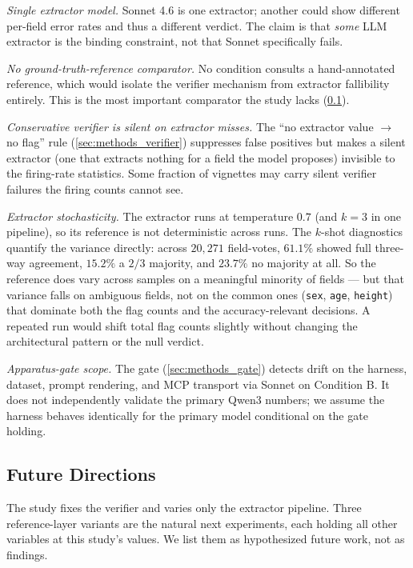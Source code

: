 \textit{Single extractor model.} Sonnet 4.6 is one extractor; another
could show different per-field error rates and thus a different verdict.
The claim is that \emph{some} LLM extractor is the binding constraint,
not that Sonnet specifically fails.

\textit{No ground-truth-reference comparator.} No condition consults a
hand-annotated reference, which would isolate the verifier mechanism
from extractor fallibility entirely. This is the most important
comparator the study lacks (\cref{sec:disc_followups}).

\textit{Conservative verifier is silent on extractor misses.} The ``no
extractor value $\rightarrow$ no flag'' rule (\cref{sec:methods_verifier})
suppresses false positives but makes a silent extractor (one that
extracts nothing for a field the model proposes) invisible to the
firing-rate statistics. Some fraction of vignettes may carry silent
verifier failures the firing counts cannot see.

\textit{Extractor stochasticity.} The extractor runs at temperature
$0.7$ (and $k=3$ in one pipeline), so its reference is not
deterministic across runs. The $k$-shot diagnostics quantify the
variance directly: across $20{,}271$ field-votes, $61.1\%$ showed full
three-way agreement, $15.2\%$ a $2/3$ majority, and $23.7\%$ no majority
at all. So the reference does vary across samples on a meaningful
minority of fields --- but that variance falls on ambiguous fields,
not on the common ones (\texttt{sex}, \texttt{age}, \texttt{height})
that dominate both the flag counts and the accuracy-relevant decisions.
A repeated run would shift total flag counts slightly without changing
the architectural pattern or the null verdict.

\textit{Apparatus-gate scope.} The gate (\cref{sec:methods_gate})
detects drift on the harness, dataset, prompt rendering, and MCP
transport via Sonnet on Condition B. It does not independently validate
the primary Qwen3 numbers; we assume the harness behaves identically
for the primary model conditional on the gate holding.

\subsection{Future Directions}
\label{sec:disc_followups}

The study fixes the verifier and varies only the extractor pipeline.
Three reference-layer variants are the natural next experiments, each
holding all other variables at this study's values. We list them as
hypothesized future work, not as findings.

